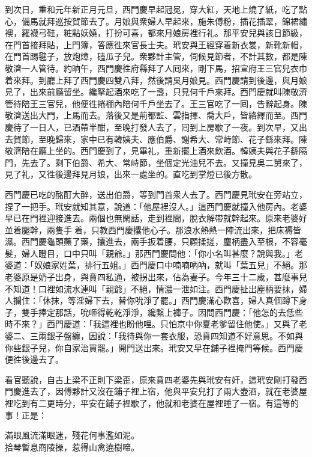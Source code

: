 到次日，重和元年新正月元旦，西門慶早起冠冕，穿大紅，天地上燒了紙，吃了點心，備馬就拜巡按賀節去了。月娘與衆婦人早起來，施朱傅粉，插花插翠，錦裙繡襖，羅襪弓鞋，粧點妖嬈，打扮可喜，都來月娘房裡行礼。那平安兒與該日節級，在門首接拜貼，上門簿，答應徃來官長士夫。玳安與王經穿着新衣裳，新靴新帽，在門首踢毽子，放炮𤍤，磕瓜子兒。衆夥計主管，伺候見節者，不計其數，都是陳敬濟一人管待。{}約晌午，西門慶徃府縣拜了人囘來，剛下馬，招宣府王三官兒衣巾着來拜。到廳上拜了西門慶四雙八拜，然後請吳月娘見。西門慶請到後邊，與月娘見了，出來前廳留坐。纔拏起酒來吃了一盞，只見何千戶來拜。西門慶就叫陳敬濟管待陪王三官兒，他便徃捲棚內陪何千戶坐去了。王三官吃了一囘，告辭起身。陳敬濟送出大門，上馬而去。落後又是荊都監、雲指揮、喬大戶，皆絡繹而至。西門慶待了一日人，已酒帶半酣，至晚打發人去了，囘到上房歇了一夜。到次早，又出去賀節，至晚歸來，家中已有韓姨夫、應伯爵、謝希大、常峙節、花子繇來拜。陳敬濟陪在廳上坐的。西門慶到了，見畢礼，重新擺上酒來飲酒。韓姨夫與花子繇隔門，先去了。剩下伯爵、希大、常峙節，坐個定光油兒不去。{}又撞見吳二舅來了，見了礼，又徃後邊拜見月娘，出來一處坐的。直吃到掌燈已後方散。

西門慶已吃的酩酊大醉，送出伯爵，等到門首衆人去了。西門慶見玳安在旁站立，捏了一把手。玳安就知其意，說道：「他屋裡沒人。」這西門慶就撞入他房內。老婆早已在門裡迎接進去。{}兩個也無閑話，走到裡間，脫衣解帶就幹起來。原來老婆好並着腿幹，兩隻手𢵞着，只教西門慶攮他心子。那浪水熱熱一陣流出來，把床褥皆濕。西門慶龜頭蘸了藥，攮進去，兩手扳着腰，只顧揉搓，麈柄盡入至根，不容毫髮，婦人瞪目，口中只叫「親爺。」那西門慶問他：「你小名叫甚麼？說與我。」老婆道：「奴娘家姓葉，排行五姐。」西門慶口中喃喃吶吶，就叫「葉五兒」不絕。那老婆原是奶子出身，與賁四私通，被拐出來，佔為妻子。今年三十二歲，甚麼事兒不知道！口裡如流水連叫「親爺」不絕，情濃一泄如注。西門慶扯出麈柄要抹，婦人攔住：「休抹，等淫婦下去，替你吮淨了罷。」西門慶滿心歡喜，婦人真個蹲下身子，雙手捧定那話，吮咂得乾乾淨淨，纔繫上褲子。因問西門慶：「他怎的去恁些時不來？」西門慶道：「我這裡也盼他哩。只怕京中你夏老爹留住他使。」又與了老婆二、三兩銀子盤纏，因說：「我待與你一套衣服，恐賁四知道不好意思。不如與你些銀子兒，你自家治買罷。」開門送出來。玳安又早在鋪子裡掩門等候。西門慶便徃後邊去了。

看官聽說，自古上梁不正則下梁歪，原來賁四老婆先與玳安有奸，這玳安剛打發西門慶進去了，因傅夥計又沒在鋪子裡上宿，他與平安兒打了兩大壺酒，就在老婆屋裡吃到有二更時分，平安在鋪子裡歇了，他就和老婆在屋裡睡了一宿。有這等的事！正是：

\begin{myquote}
滿眼風流滿眼迷，殘花何事濫如泥。\\拾琴暫息商陵操，惹得山禽遶樹啼。
\end{myquote}

